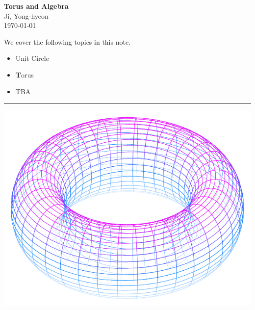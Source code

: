 \documentclass[11pt,openany]{article}
\begin{document}
\begin{center}
	\huge\textbf{{\color{red}T}{\color{orange}o}{\color{green!75!black}r}{\color{cyan}u}{\color{violet}s} and Algebra}\\
	\vspace{0.5em}
	\large{Ji, Yong-hyeon}\\
	\vspace{0.5em}
	\normalsize{\today}\\
\end{center}

\noindent 
We cover the following topics in this note.
\begin{itemize}
	\item Unit Circle
	\item {\bfseries\color{red}T}{\color{orange}o}{\color{green!75!black}r}{\color{cyan}u}{\color{violet}s}
	\item TBA
\end{itemize}
\hrule\vspace{12pt}
\begin{center}
\includegraphics[scale=1]{torus.pdf}
\end{center}
\tableofcontents

\newpage
\end{document}
